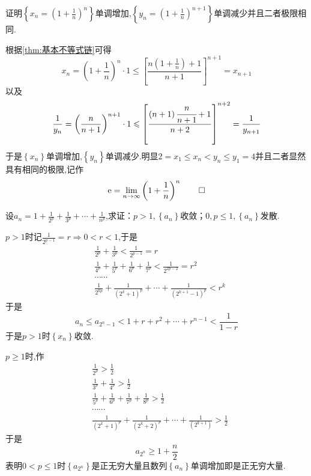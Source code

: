 \begin{brown}
    \begin{example}
        证明$\displaystyle\left\{x_n=\left(1+\frac{1}{n}\right)^n\right\}$单调增加,$\displaystyle\left\{y_n=\left(1+\frac{1}{n}\right)^{n+1}\right\}$单调减少并且二者极限相同.
    \end{example}
    \begin{Proof}
        根据\cref{thm:基本不等式链}可得\[
        x_n=\left(1+\frac{1}{n}\right)^n\cdot1\leqslant\left[
            \frac{n\left(1+\frac{1}{n}\right)+1}{n+1}
        \right]^{n+1}=x_{n+1}
        \]以及\[
        \frac{1}{y_n}=\left(\frac{n}{n+1}\right)^{n+1}\cdot1\leqslant\left[
\frac{
    \left(n+1\right)\cfrac{n}{n+1}+1
}{n+2}
        \right]^{n+2}=\frac{1}{y_{n+1}}
        \]于是$\left\{x_n\right\}$单调增加,$\left\{y_n\right\}$单调减少.明显$2=x_1\leqslant x_n<y_n\leqslant y_1=4$并且二者显然具有相同的极限,记作\[
        \mathrm{e}=\lim_{n\to\infty}\left(1+\frac{1}{n}\right)^n\qedhere
        \]
    \end{Proof}
\end{brown}
\begin{brown}
    \begin{example}\label{ex:2}
        设$\displaystyle a_n=1+\frac{1}{2^p}+\frac{1}{3^p}+\cdots+\frac{1}{n^p}$,求证：$p>1,\left\{a_n\right\}$收敛；$0,p\leqslant 1,\left\{a_n\right\}$发散.
    \end{example}
    \begin{Proof}
        $p>1$时记$\displaystyle \frac{1}{2^{p-1}}=r\Longrightarrow0<r<1$,于是\begin{align*}
            &\frac{1}{2^p}+\frac{1}{3^p}<\frac{1}{2^{p-1}}=r\\
            &\frac{1}{4^p}+\frac{1}{5^p}+\frac{1}{6^p}+\frac{1}{7^p}<\frac{1}{2^{2p-2}}=r^2\\
            &\cdots\cdots\\
            &\frac{1}{2^{kp}}+\frac{1}{\left(2^k+1\right)^p}+\cdots+\frac{1}{\left(2^{k+1}-1\right)^p}<r^k
        \end{align*}于是\[
        a_n\leqslant a_{2^n-1}<1+r+r^2+\cdots+r^{n-1}<\frac{1}{1-r}
        \]于是$p>1$时$\left\{x_n\right\}$收敛.

        $p\geqslant 1$时,作\begin{align*}
            &\frac{1}{2^p}>\frac{1}{2}\\
            &\frac{1}{3^p}+\frac{1}{4^p}>\frac{1}{2}\\
            &\frac{1}{5^p}+\frac{1}{6^p}+\frac{1}{7^p}+\frac{1}{8^p}>\frac{1}{2}\\
            &\cdots\cdots\\
            &\frac{1}{\left(2^k+1\right)^p}+\frac{1}{\left(2^k+2\right)^p}+\cdots+\frac{1}{\left(2^{k+1}\right)}>\frac{1}{2}
        \end{align*}于是\[
        a_{2^n}\geqslant1+\frac{n}{2}
        \]表明$0<p\leqslant 1$时$\left\{a_{2^n}\right\}$是正无穷大量且数列$\left\{a_n\right\}$单调增加即是正无穷大量.
    \end{Proof}
\end{brown}
